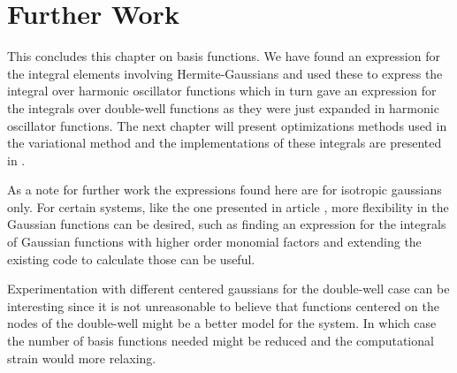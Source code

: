 \section{Further Work}
    This concludes this chapter on basis functions. We have found an expression
    for the integral elements involving Hermite-Gaussians and used these to
    express the integral over harmonic oscillator functions which in turn gave
    an expression for the integrals over double-well functions as they were
    just expanded in harmonic oscillator functions. The next chapter will
    present optimizations methods used in the variational method and the
    implementations of these integrals are presented in .

    As a note for further work the expressions found here are for isotropic
    gaussians only. For certain systems, like the one presented in article
    \cite{nonIsoGauss}, more flexibility in the Gaussian functions can be
    desired, such as finding an expression for the integrals of Gaussian
    functions with higher order monomial factors and extending the existing
    code to calculate those can be useful.

    Experimentation with different centered gaussians for the double-well case
    can be interesting since it is not unreasonable to believe that functions
    centered on the nodes of the double-well might be a better model for the
    system. In which case the number of basis functions needed might be reduced
    and the computational strain would more relaxing.
